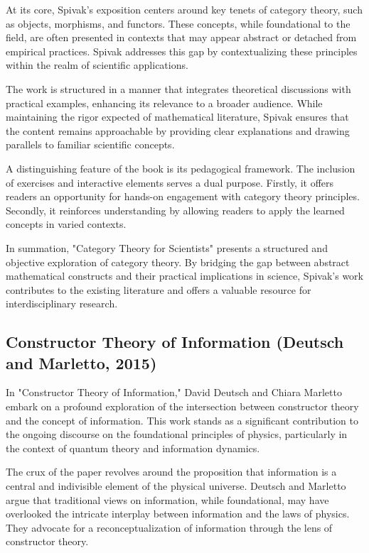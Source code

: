 \documentclass[sn-nature]{sn-jnl}%
\theoremstyle{thmstyleone}%
\theoremstyle{thmstyletwo}%
\theoremstyle{thmstylethree}%
\begin{document}
At its core, Spivak's exposition centers around key tenets of category theory, such as objects, morphisms, and functors. These concepts, while foundational to the field, are often presented in contexts that may appear abstract or detached from empirical practices. Spivak addresses this gap by contextualizing these principles within the realm of scientific applications.

The work is structured in a manner that integrates theoretical discussions with practical examples, enhancing its relevance to a broader audience. While maintaining the rigor expected of mathematical literature, Spivak ensures that the content remains approachable by providing clear explanations and drawing parallels to familiar scientific concepts.

A distinguishing feature of the book is its pedagogical framework. The inclusion of exercises and interactive elements serves a dual purpose. Firstly, it offers readers an opportunity for hands-on engagement with category theory principles. Secondly, it reinforces understanding by allowing readers to apply the learned concepts in varied contexts.

In summation, "Category Theory for Scientists" presents a structured and objective exploration of category theory. By bridging the gap between abstract mathematical constructs and their practical implications in science, Spivak's work contributes to the existing literature and offers a valuable resource for interdisciplinary research.
\subsection{Constructor Theory of Information (Deutsch and Marletto, 2015)\cite{deutsch_constructor_2015}}

In "Constructor Theory of Information," David Deutsch and Chiara Marletto embark on a profound exploration of the intersection between constructor theory and the concept of information. This work stands as a significant contribution to the ongoing discourse on the foundational principles of physics, particularly in the context of quantum theory and information dynamics.

The crux of the paper revolves around the proposition that information is a central and indivisible element of the physical universe. Deutsch and Marletto argue that traditional views on information, while foundational, may have overlooked the intricate interplay between information and the laws of physics. They advocate for a reconceptualization of information through the lens of constructor theory.
\end{document}

